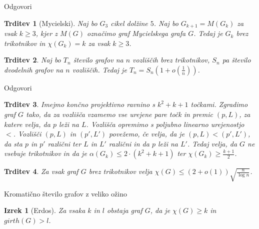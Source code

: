 \documentclass[t]{beamer} %
\newtheorem{trditev}{Trditev}
\newtheorem{izrek}{Izrek}
\begin{document}
\begin{frame}[fragile]{Odgovori}
  \begin{trditev}[Mycielski]
    Naj bo $G_3$ cikel dolžine $5$. Naj bo $G_{k+1} = M(G_k)$ za vsak $k \geq 3$, kjer z $M(G)$ označimo graf Mycielskega grafa $G$. Tedaj je $G_k$ brez trikotnikov in $\chi(G_k) = k$ za vsak $k \geq 3$.
  \end{trditev}
  \pause
  \begin{trditev}
    Naj bo $T_n$ število grafov na $n$ vozliščih brez trikotnikov, $S_n$ pa število dvodelnih grafov na $n$ vozliščih. Tedaj je $T_n = S_n(1 + o(\frac{1}{n}))$.
  \end{trditev}
\end{frame}

\begin{frame}{Odgovori}
  \begin{trditev}
    Imejmo končno projektivno ravnino s $k^2 + k + 1$ točkami. Zgradimo graf $G$ tako, da za vozlišča vzamemo vse urejene pare točk in premic $(p, L)$, za katere velja,
    da $p$ leži na $L$. Vozlišča opremimo s poljubno linearno urejenostjo $<$. Vozlišči $(p, L)$ in $(p', L')$ povežemo, če velja, da je $(p, L) < (p', L')$, da sta $p$ in $p'$ različni ter $L$ in $L'$
    različni in da $p$ leži na $L'$. Tedaj velja, da $G$ ne vsebuje trikotnikov in da je $\alpha(G_k) \leq 2 \cdot (k^2 + k + 1)$ ter $\chi(G_k) \geq \frac{k + 1}{2}$.
  \end{trditev}
  \pause
  \begin{trditev}
    Za vsak graf $G$ brez trikotnikov velja $\chi(G) \leq (2 + o(1))\sqrt{\frac{n}{\log{n}}}$.
  \end{trditev}
\end{frame}

\begin{frame}{Kromatično število grafov z veliko ožino}
  \begin{izrek}[Erdos]
    Za vsaka $k$ in $l$ obstaja graf $G$, da je $\chi(G) \geq k$ in $girth(G) > l$.
  \end{izrek}
\end{frame}
\end{document}
